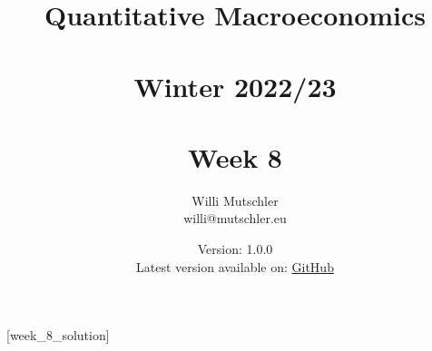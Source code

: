 
\newif\ifDisplaySolutions%


\title{Quantitative Macroeconomics\\~\\Winter 2022/23\\~\\Week 8}
\author{Willi Mutschler\\willi@mutschler.eu}
\date{Version: 1.0.0\\Latest version available on: \href{https://github.com/wmutschl/Quantitative-Macroeconomics/releases/latest/download/week_8.pdf}{GitHub}}
\maketitle\thispagestyle{empty}

\newpage
{}[week_8_solution]
\tableofcontents\thispagestyle{empty}\newpage

\setcounter{page}{1}
\newpage
\newpage
\newpage
\printbibliography
\newpage

\ifDisplaySolutions
\newpage
\appendix
\section{Solutions}

\fi
